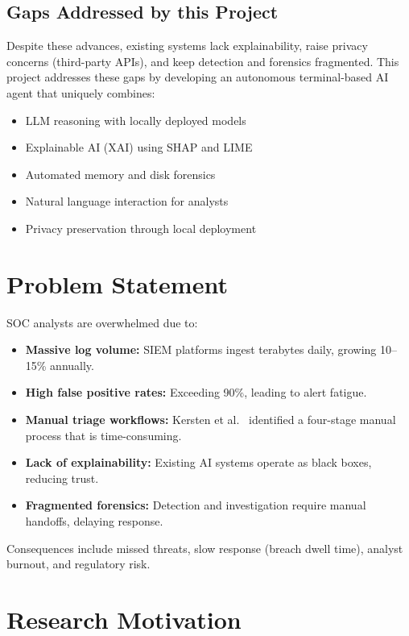\documentclass[12pt,a4paper]{report}
\begin{document}
\subsection{Gaps Addressed by this Project}
Despite these advances, existing systems lack explainability, raise privacy concerns (third-party APIs), and keep detection and forensics fragmented. This project addresses these gaps by developing an autonomous terminal-based AI agent that uniquely combines:
\begin{itemize}
    \item LLM reasoning with locally deployed models
    \item Explainable AI (XAI) using SHAP and LIME
    \item Automated memory and disk forensics
    \item Natural language interaction for analysts
    \item Privacy preservation through local deployment
\end{itemize}

\section{Problem Statement}

SOC analysts are overwhelmed due to:
\begin{itemize}
    \item \textbf{Massive log volume:} SIEM platforms ingest terabytes daily, growing 10--15\% annually.
    \item \textbf{High false positive rates:} Exceeding 90\%, leading to alert fatigue.
    \item \textbf{Manual triage workflows:} Kersten et al.~\cite{kersten2023} identified a four-stage manual process that is time-consuming.
    \item \textbf{Lack of explainability:} Existing AI systems operate as black boxes, reducing trust.
    \item \textbf{Fragmented forensics:} Detection and investigation require manual handoffs, delaying response.
\end{itemize}

Consequences include missed threats, slow response (breach dwell time), analyst burnout, and regulatory risk.

\section{Research Motivation}
\end{document}
